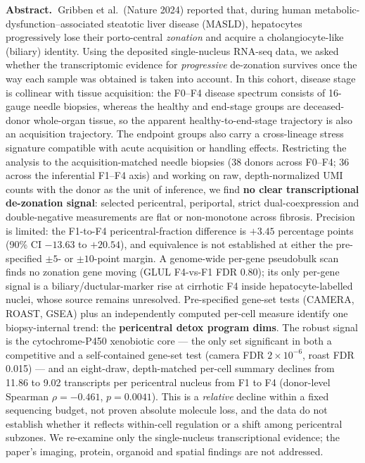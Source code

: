 \documentclass[11pt,a4paper]{article}
\begin{document}
{\small\noindent\textbf{Abstract.~}Gribben et al.\ (Nature 2024) reported that, during human metabolic-dysfunction--associated steatotic liver disease (MASLD), hepatocytes progressively lose their porto-central \emph{zonation} and acquire a cholangiocyte-like (biliary) identity. Using the deposited single-nucleus RNA-seq data, we asked whether the transcriptomic evidence for \emph{progressive} de-zonation survives once the way each sample was obtained is taken into account. In this cohort, disease stage is collinear with tissue acquisition: the F0--F4 disease spectrum consists of 16-gauge needle biopsies, whereas the healthy and end-stage groups are deceased-donor whole-organ tissue, so the apparent healthy-to-end-stage trajectory is also an acquisition trajectory. The endpoint groups also carry a cross-lineage stress signature compatible with acute acquisition or handling effects. Restricting the analysis to the acquisition-matched needle biopsies (38 donors across F0--F4; 36 across the inferential F1--F4 axis) and working on raw, depth-normalized UMI counts with the donor as the unit of inference, we find \textbf{no clear transcriptional de-zonation signal}: selected pericentral, periportal, strict dual-coexpression and double-negative measurements are flat or non-monotone across fibrosis. Precision is limited: the F1-to-F4 pericentral-fraction difference is $+3.45$ percentage points (90\% CI $-13.63$ to $+20.54$), and equivalence is not established at either the pre-specified $\pm5$- or $\pm10$-point margin. A genome-wide per-gene pseudobulk scan finds no zonation gene moving (GLUL F4-vs-F1 FDR 0.80); its only per-gene signal is a biliary/ductular-marker rise at cirrhotic F4 inside hepatocyte-labelled nuclei, whose source remains unresolved. Pre-specified gene-set tests (CAMERA, ROAST, GSEA) plus an independently computed per-cell measure identify one biopsy-internal trend: the \textbf{pericentral detox program dims}. The robust signal is the cytochrome-P450 xenobiotic core --- the only set significant in both a competitive and a self-contained gene-set test (camera FDR $2\times10^{-6}$, roast FDR 0.015) --- and an eight-draw, depth-matched per-cell summary declines from 11.86 to 9.02 transcripts per pericentral nucleus from F1 to F4 (donor-level Spearman $\rho=-0.461$, $p=0.0041$). This is a \emph{relative} decline within a fixed sequencing budget, not proven absolute molecule loss, and the data do not establish whether it reflects within-cell regulation or a shift among pericentral subzones. We re-examine only the single-nucleus transcriptional evidence; the paper's imaging, protein, organoid and spatial findings are not addressed.}\par\vspace{0.5em}
\end{document}
